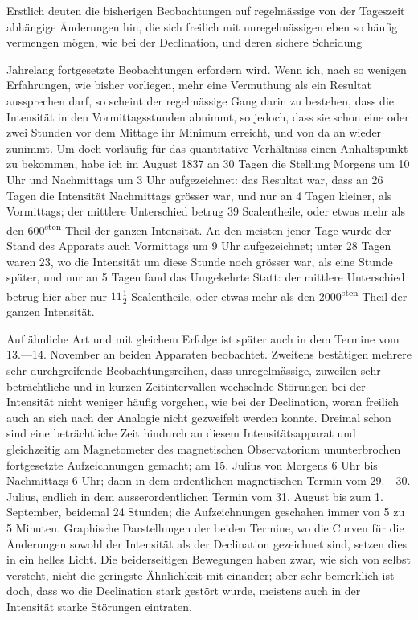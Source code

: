 Erstlich deuten die bisherigen Beobachtungen auf regelmässige von der Tageszeit abhängige Änderungen hin, die sich freilich mit unregelmässigen eben so häufig vermengen mögen, wie bei der Declination, und deren sichere Scheidung
\par\clearpage
{}
\noindent Jahrelang fortgesetzte Beobachtungen erfordern wird. Wenn ich, nach so wenigen Erfahrungen, wie bisher vorliegen, mehr eine Vermuthung als ein Resultat aussprechen darf, so scheint der regelmässige Gang darin zu bestehen, dass die Intensität in den Vormittagsstunden abnimmt, so jedoch, dass sie schon eine oder zwei Stunden vor dem Mittage ihr Minimum erreicht, und von da an wieder zunimmt. Um doch vorläufig für das quantitative Verhältniss einen Anhaltspunkt zu bekommen, habe ich im August 1837 an 30 Tagen die Stellung Morgens um 10 Uhr und Nachmittags um 3 Uhr aufgezeichnet: das Resultat war, dass an 26 Tagen die Intensität Nachmittags grösser war, und nur an 4 Tagen kleiner, als Vormittags; der mittlere Unterschied betrug 39 Scalentheile, oder etwas mehr als den 600\textsuperscript{sten} Theil der ganzen Intensität. An den meisten jener Tage wurde der Stand des Apparats auch Vormittags um 9 Uhr aufgezeichnet; unter 28 Tagen waren 23, wo die Intensität um diese Stunde noch grösser war, als eine Stunde später, und nur an 5 Tagen fand das Umgekehrte Statt: der mittlere Unterschied betrug hier aber nur $11\frac{1}{2}$ Scalentheile, oder etwas mehr als den 2000\textsuperscript{sten} Theil der ganzen Intensität.

\expandafter\def\csname HistoricalNoteText371\endcsname{Auf ähnliche Art und mit gleichem Erfolge ist später auch in dem Termine vom 13.---14. November an beiden Apparaten beobachtet.}
Zweitens bestätigen mehrere sehr durchgreifende Beobachtungsreihen, dass unregelmässige, zuweilen sehr beträchtliche und in kurzen Zeitintervallen wechselnde Störungen bei der Intensität nicht weniger häufig vorgehen, wie bei der Declination, woran freilich auch an sich nach der Analogie nicht gezweifelt werden konnte. Dreimal schon sind eine beträchtliche Zeit hindurch an diesem Intensitätsapparat und gleichzeitig am Magnetometer des magnetischen Observatorium ununterbrochen fortgesetzte Aufzeichnungen gemacht; am 15. Julius von Morgens 6 Uhr bis Nachmittags 6 Uhr; dann in dem ordentlichen magnetischen Termin vom 29.---30. Julius, endlich in dem ausserordentlichen Termin vom 31. August bis zum 1. September, beidemal 24 Stunden; die Aufzeichnungen geschahen immer von 5 zu 5 Minuten. Graphische Darstellungen der beiden Termine, wo die Curven für die Änderungen sowohl der Intensität als der Declination gezeichnet sind, setzen dies in ein helles Licht. Die beiderseitigen Bewegungen haben zwar, wie sich von selbst versteht, nicht die geringste Ähnlichkeit mit einander; aber sehr bemerklich ist doch, dass wo die Declination stark gestört wurde, meistens auch in der Intensität starke Störungen eintraten.
